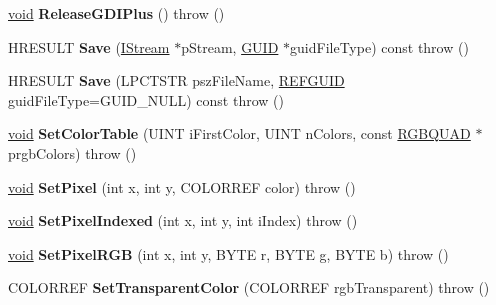 \begin{DoxyCompactItemize}
\hyperlink{interfacevoid}{void} {\bfseries Release\+G\+D\+I\+Plus} ()  throw ()
\item 
\mbox{\label{class_a_t_l_1_1_c_image_a284e6fa3b5bdbbed6b96881a87d40731}} 
H\+R\+E\+S\+U\+LT {\bfseries Save} (\hyperlink{interface_i_stream}{I\+Stream} $\ast$p\+Stream, \hyperlink{interface_g_u_i_d}{G\+U\+ID} $\ast$guid\+File\+Type) const  throw ()
\item 
\mbox{\label{class_a_t_l_1_1_c_image_a3e08d0e2827bcebf097379d21fbe4984}} 
H\+R\+E\+S\+U\+LT {\bfseries Save} (L\+P\+C\+T\+S\+TR psz\+File\+Name, \hyperlink{struct___g_u_i_d}{R\+E\+F\+G\+U\+ID} guid\+File\+Type=G\+U\+I\+D\+\_\+\+N\+U\+LL) const  throw ()
\item 
\mbox{\label{class_a_t_l_1_1_c_image_a89cac753cae1f0298f7dc99e9d8939e8}} 
\hyperlink{interfacevoid}{void} {\bfseries Set\+Color\+Table} (U\+I\+NT i\+First\+Color, U\+I\+NT n\+Colors, const \hyperlink{structtag_r_g_b_q_u_a_d}{R\+G\+B\+Q\+U\+AD} $\ast$prgb\+Colors)  throw ()
\item 
\mbox{\label{class_a_t_l_1_1_c_image_ada9c324b5b858a5f2a36da5e867e30c4}} 
\hyperlink{interfacevoid}{void} {\bfseries Set\+Pixel} (int x, int y, C\+O\+L\+O\+R\+R\+EF color)  throw ()
\item 
\mbox{\label{class_a_t_l_1_1_c_image_afe314a9eb32ba6290c8f845998c9be13}} 
\hyperlink{interfacevoid}{void} {\bfseries Set\+Pixel\+Indexed} (int x, int y, int i\+Index)  throw ()
\item 
\mbox{\label{class_a_t_l_1_1_c_image_a25ffca9dac052fcfeb2152d67a45670c}} 
\hyperlink{interfacevoid}{void} {\bfseries Set\+Pixel\+R\+GB} (int x, int y, B\+Y\+TE r, B\+Y\+TE g, B\+Y\+TE b)  throw ()
\item 
\mbox{\label{class_a_t_l_1_1_c_image_ac9c918698db463c531e430ed050edf39}} 
C\+O\+L\+O\+R\+R\+EF {\bfseries Set\+Transparent\+Color} (C\+O\+L\+O\+R\+R\+EF rgb\+Transparent)  throw ()
\item 
\mbox{\label{class_a_t_l_1_1_c_image_adee8fddca388cde337a92e5c9e313844}} 

\end{DoxyCompactItemize}
